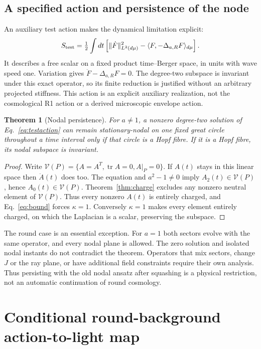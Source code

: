 \documentclass[11pt,a4paper]{article}
\newtheorem{theorem}{Theorem}\newtheorem{corollary}{Corollary}
\newcommand{\tr}{\operatorname{tr}}\newcommand{\asympart}{\operatorname{Asym}}
\begin{document}
\subsection{A specified action and persistence of the node}

An auxiliary test action makes the dynamical limitation explicit:
\begin{equation}
 S_{\rm test}=\tfrac12\int dt\left[
 \|\dot F\|_{L^2(d\mu)}^2-\langle F,-\Delta_{a,R}F\rangle_{d\mu}\right].
 \label{eq:testaction}
\end{equation}
It describes a free scalar on a fixed product time--Berger space, in
units with wave speed one. Variation gives $\ddot F-\Delta_{a,R}F=0$.
The degree-two subspace is invariant under this exact operator, so its
finite reduction is justified without an arbitrary projected stiffness.
This action is an explicit auxiliary realization, not the cosmological
R1 action or a derived microscopic envelope action.

\begin{theorem}[Nodal persistence]
\label{thm:persistence}
For $a\ne1$, a nonzero degree-two solution of
Eq.~\eqref{eq:testaction} can remain stationary-nodal on one fixed
great circle throughout a time interval only if that circle is a Hopf
fibre. If it is a Hopf fibre, its nodal subspace is invariant.
\end{theorem}
\begin{proof}
Write $\mathcal V(P)=\{A=A^T,\tr A=0,A|_P=0\}$. If $A(t)$ stays
in this linear space then $\ddot A(t)$ does too. The equation and
$a^2-1\ne0$ imply $A_2(t)\in\mathcal V(P)$, hence
$A_0(t)\in\mathcal V(P)$. Theorem~\ref{thm:charge} excludes any
nonzero neutral element of $\mathcal V(P)$. Thus every nonzero
$A(t)$ is entirely charged, and Eq.~\eqref{eq:bound} forces
$\kappa=1$. Conversely $\kappa=1$ makes every element entirely
charged, on which the Laplacian is a scalar, preserving the subspace.
\end{proof}

The round case is an essential exception. For $a=1$ both sectors
evolve with the same operator, and every nodal plane is allowed.
The zero solution and isolated nodal instants do not contradict the
theorem. Operators that mix sectors, change $J$ or the ray plane, or
have additional field constraints require their own analysis. Thus
persisting with the old nodal ansatz after squashing is a physical
restriction, not an automatic continuation of round cosmology.

\section{Conditional round-background action-to-light map}
\label{sec:optics}
\end{document}
